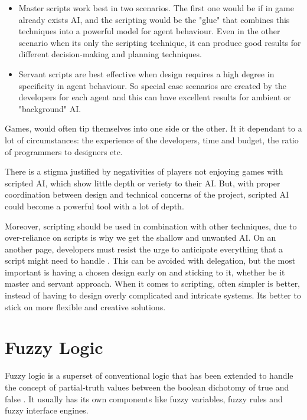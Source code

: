 \documentclass[a4paper, 12pt]{book}
\begin{document}
\begin{itemize}
    \item Master scripts work best in two scenarios. The first one would be if in game already exists AI, and the scripting would be the "glue" that combines this techniques into a powerful model for agent behaviour. Even in the other scenario when its only the scripting technique, it can produce good results for different decision-making and planning techniques.
    \item Servant scripts are best effective when design requires a high degree in specificity in agent behaviour. So special case scenarios are created by the developers for each agent and this can have excellent results for ambient or "background" AI.
\end{itemize}

Games, would often tip themselves into one side or the other. It it dependant to a lot of circumstances: the experience of the developers, time and budget, the ratio of programmers to designers etc.


There is a stigma justified by negativities of players not enjoying games with scripted AI, which show little depth or veriety to their AI. But, with proper coordination between design and technical concerns of the project, scripted AI could become a powerful tool with a lot of depth.

Moreover, scripting should be used in combination with other techniques, due to over-reliance on scripts is why we get the shallow and unwanted AI. On an another page, developers must resist the urge to anticipate everything that a script might need to handle \cite{ForbiddenScripting}. This can be avoided with delegation, but the most important is having a chosen design early on and sticking to it, whether be it master and servant approach. When it comes to scripting, often simpler is better, instead of having to design overly complicated and intricate systems. Its better to stick on more flexible and creative solutions.

\section{Fuzzy Logic}

Fuzzy logic is a superset of conventional logic that has been extended to handle the concept of partial-truth values between the boolean dichotomy of true and false \cite{FuzzyAIGames}. It usually has its own components like fuzzy variables, fuzzy rules and fuzzy interface engines.
\end{document}
